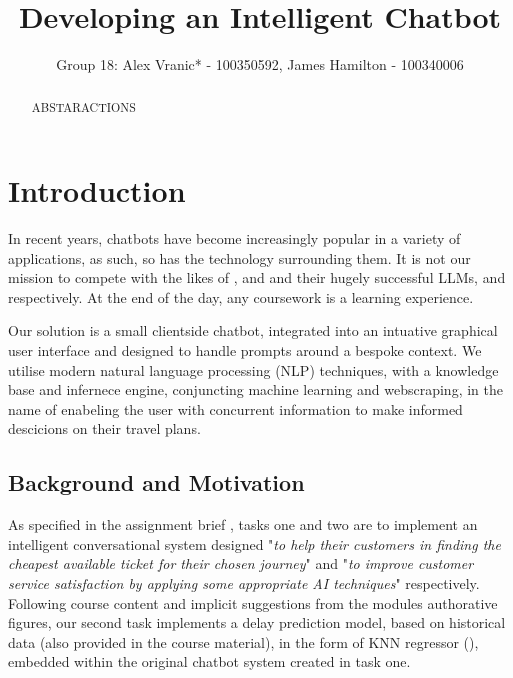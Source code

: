\documentclass[11pt]{article}
\title{Developing an Intelligent Chatbot}
\author{Group 18: Alex Vranic* - 100350592, James Hamilton - 100340006}
\begin{document}
\maketitle

\begin{abstract}
    ABSTARACTIONS

\end{abstract}

\section{Introduction}

In recent years, chatbots have become increasingly popular in a variety of applications, as such, so has the technology surrounding them. It is not our mission to compete with the likes of \cite{openai}, \cite{microsoft} and \cite{github} and their hugely successful LLMs, \cite{gpt4} and \cite{copilot} respectively. At the end of the day, any coursework is a learning experience.

Our solution is a small clientside chatbot, integrated into an intuative graphical user interface and designed to handle prompts around a bespoke context. We utilise modern natural language processing (NLP) techniques, with a knowledge base and infernece engine, conjuncting machine learning and webscraping, in the name of enabeling the user with concurrent information to make informed descicions on their travel plans.

\subsection{Background and Motivation}

As specified in the assignment brief \cite{AI2018CW}, tasks one and two are to implement an intelligent conversational system designed "\textit{to help their customers in finding the cheapest available ticket for their chosen journey}" and "\textit{to improve customer service satisfaction by applying some appropriate AI techniques}" respectively. Following course content and implicit suggestions from the modules authorative figures, our second task implements a delay prediction model, based on historical data (also provided in the course material), in the form of KNN regressor (\cite{knn}), embedded within the original chatbot system created in task one.
\end{document}

